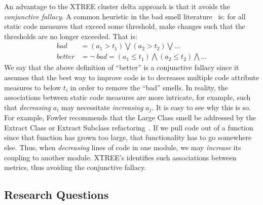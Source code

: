 \documentclass[twocolumn,5p]{elsarticle}
\theoremstyle{break}
\begin{document}
	An advantage to the XTREE cluster delta approach is that it avoids the 
	{\em conjunctive fallacy}.
	A common heuristic in the bad smell literature~\cite{erni96,bender99,Shatnawi10,Alves2010,hermans15} is: for all static code measures that exceed some threshold, make changes such that the thresholds are no longer exceeded. That is:
	\begin{equation}\label{eq:df}
		\scriptstyle
		\begin{array}{rl}
			\mathit{bad}    & = \left(a_1 > t_1 \right) \bigvee \left(a_2 > t_2\right) \bigvee    ...                             \\
			\mathit{better} & = \neg\;\mathit{bad} = \left(a_1 \le t_1 \right) \bigwedge \left(a_2 \le t_2\right)  \bigwedge  ... 
		\end{array}
	\end{equation}
	We say that the above definition of ``better'' is a conjunctive fallacy
	since it assumes that the best way to improve code is to decreases multiple code attribute measures to below $t_i$ in order
	to remove the ``bad'' smells. In reality, the associations between static code measures are more intricate, for example,
	such that {\em decreasing}  $a_i$ may necessitate {\em increasing} $a_j$.
	It is easy to see why this is so.
	For example, Fowler recommends that the Large Class smell be addressed by the Extract Class or Extract Subclass refactoring~\cite{fowler99}. If we pull code out of a function since that function has grown too
	large, that functionality has to go somewhere else. Thus, when \textit{decreasing} lines of code in one module, we may \textit{increase} its coupling to another module. XTREE's identifies such associations between metrics, thus avoiding the conjunctive fallacy.
	
	\subsection{Research Questions}
	
\end{document}

